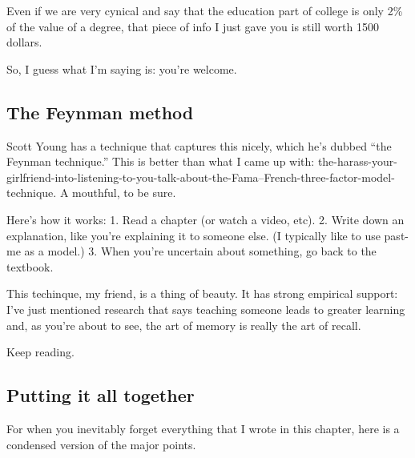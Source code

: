 Even if we are very cynical and say that the education part of college
is only 2\% of the value of a degree, that piece of info I just gave you
is still worth 1500 dollars.

So, I guess what I'm saying is: you're welcome.

\subsection{The Feynman method}\label{the-feynman-method}

Scott Young has a technique that captures this nicely, which he's dubbed
``the Feynman technique.'' This is better than what I came up with:
the-harass-your-girlfriend-into-listening-to-you-talk-about-the-Fama--French-three-factor-model-technique.
A mouthful, to be sure.

Here's how it works: 1. Read a chapter (or watch a video, etc). 2. Write
down an explanation, like you're explaining it to someone else. (I
typically like to use past-me as a model.) 3. When you're uncertain
about something, go back to the textbook.

This techinque, my friend, is a thing of beauty. It has strong empirical
support: I've just mentioned research that says teaching someone leads
to greater learning and, as you're about to see, the art of memory is
really the art of recall.

Keep reading.

\subsection{Putting it all together}\label{putting-it-all-together}

For when you inevitably forget everything that I wrote in this chapter,
here is a condensed version of the major points.

